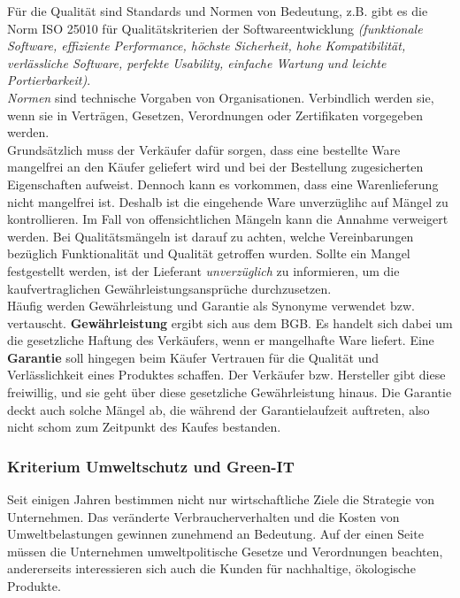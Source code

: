 \documentclass[a4paper, 12pt]{report}
\begin{document}
\begin{multicols}{2}
Für die Qualität sind Standards und Normen von Bedeutung, z.B. gibt es die Norm
ISO 25010 für Qualitätskriterien der Softwareentwicklung \emph{(funktionale
Software, effiziente Performance, höchste Sicherheit, hohe Kompatibilität,
verlässliche Software, perfekte Usability, einfache Wartung und leichte
Portierbarkeit)}. \\

\emph{Normen} sind technische Vorgaben von Organisationen. Verbindlich werden
sie, wenn sie in Verträgen, Gesetzen, Verordnungen oder Zertifikaten vorgegeben
werden. \\

Grundsätzlich muss der Verkäufer dafür sorgen, dass eine bestellte Ware
mangelfrei an den Käufer geliefert wird und bei der Bestellung zugesicherten
Eigenschaften aufweist. Dennoch kann es vorkommen, dass eine Warenlieferung
nicht mangelfrei ist. Deshalb ist die eingehende Ware unverzüglihc auf Mängel
zu kontrollieren. Im Fall von offensichtlichen Mängeln kann die Annahme
verweigert werden. Bei Qualitätsmängeln ist darauf zu achten, welche
Vereinbarungen bezüglich Funktionalität und Qualität getroffen wurden. Sollte
ein Mangel festgestellt werden, ist der Lieferant \emph{unverzüglich} zu
informieren, um die kaufvertraglichen Gewährleistungsansprüche durchzusetzen. \\

Häufig werden Gewährleistung und Garantie als Synonyme verwendet bzw.
vertauscht. \textbf{Gewährleistung} ergibt sich aus dem BGB. Es handelt sich
dabei um die gesetzliche Haftung des Verkäufers, wenn er mangelhafte Ware
liefert. Eine \textbf{Garantie} soll hingegen beim Käufer Vertrauen für die
Qualität und Verlässlichkeit eines Produktes schaffen. Der Verkäufer bzw.
Hersteller gibt diese freiwillig, und sie geht über diese gesetzliche
Gewährleistung hinaus. Die Garantie deckt auch solche Mängel ab, die während der
Garantielaufzeit auftreten, also nicht schom zum Zeitpunkt des Kaufes bestanden.

\subsubsection{Kriterium Umweltschutz und Green-IT}

Seit einigen Jahren bestimmen nicht nur wirtschaftliche Ziele die Strategie von
Unternehmen. Das veränderte Verbraucherverhalten und die Kosten von
Umweltbelastungen gewinnen zunehmend an Bedeutung. Auf der einen Seite müssen
die Unternehmen umweltpolitische Gesetze und Verordnungen beachten, andererseits
interessieren sich auch die Kunden für nachhaltige, ökologische Produkte. \\


\end{multicols}
\end{document}
